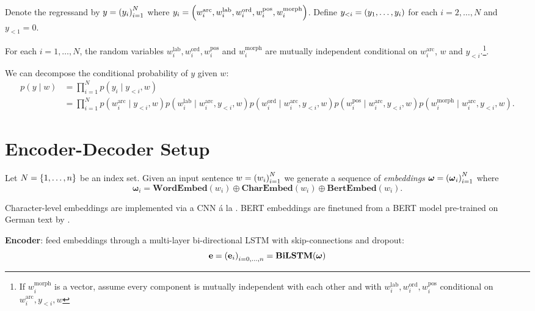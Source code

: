 \documentclass{report}
\theoremstyle{definition}
\theoremstyle{plain}
\theoremstyle{definition}
\theoremstyle{remark}
\numberwithin{equation}{section}
\numberwithin{figure}{section}
\numberwithin{table}{section}
\begin{document}
Denote the regressand by \(y = \qty(y_{i})_{i=1}^{N}\) where \(y_{i} = \qty(w_{i}^{\mathrm{arc}}, w_{i}^{\mathrm{lab}}, w_{i}^{\mathrm{ord}}, w_{i}^{\mathrm{pos}}, w_{i}^{\mathrm{morph}})\). Define \(y_{<i} = \qty(y_{1}, \ldots, y_{i})\) for each \(i = 2, \ldots, N\) and \(y_{<1} = 0\).

\begin{assumption}
    For each \(i = 1, \ldots, N\), the random variables \(w_{i}^{\mathrm{lab}}, w_{i}^{\mathrm{ord}}, w_{i}^{\mathrm{pos}}\) and \(w_{i}^{\mathrm{morph}}\) are mutually independent conditional on \(w_{i}^{\mathrm{arc}}\), \(w\) and \(y_{<i}\).\footnote{If \(w_{i}^{\mathrm{morph}}\) is a vector, assume every component is mutually independent with each other and with \(w_{i}^{\mathrm{lab}}, w_{i}^{\mathrm{ord}}, w_{i}^{\mathrm{pos}}\) conditional on \(w_{i}^{\mathrm{arc}}, y_{<i}, w\)}.
\end{assumption}

We can decompose the conditional probability of \(y\) given \(w\):
\begin{align}
    p(y \mid w) &= \prod_{i=1}^{N} p(y_{i} \mid y_{<i}, w) \\
                &= \boxed{\prod_{i=1}^{N} p(w_{i}^{\mathrm{arc}} \mid y_{<i}, w) p(w_{i}^{\mathrm{lab}} \mid w_{i}^{\mathrm{arc}}, y_{<i}, w) p(w_{i}^{\mathrm{ord}} \mid w_{i}^{\mathrm{arc}}, y_{<i}, w) p(w_{i}^{\mathrm{pos}} \mid w_{i}^{\mathrm{arc}}, y_{<i}, w) p(w_{i}^{\mathrm{morph}} \mid w_{i}^{\mathrm{arc}}, y_{<i}, w).}
\end{align}


\section{Encoder-Decoder Setup}
Let \(N = \qty{1, \ldots, n}\) be an index set. Given an input sentence \(w = \qty(w_{i})_{i=1}^{N}\) we generate a sequence of \textit{embeddings} \(\boldsymbol{\omega} = \qty(\boldsymbol{\omega}_{i})_{i=1}^{N}\) where
\[
    \boldsymbol{\omega}_{i} = \mathbf{WordEmbed}(w_{i}) \oplus \mathbf{CharEmbed}(w_{i}) \oplus \mathbf{BertEmbed}(w_{i}).
\]

Character-level embeddings are implemented via a CNN á la \textcite{chiu2016named}. BERT embeddings are finetuned from a BERT model pre-trained on German text by \textcite{bert-base-german-cased}.

\textbf{Encoder}: feed embeddings through a multi-layer bi-directional LSTM with skip-connections and dropout:
\[
    \vb{e} = \qty(\vb{e}_{i})_{i = 0, \ldots, n} = \mathbf{BiLSTM}(\boldsymbol{\omega})
\]
\end{document}
